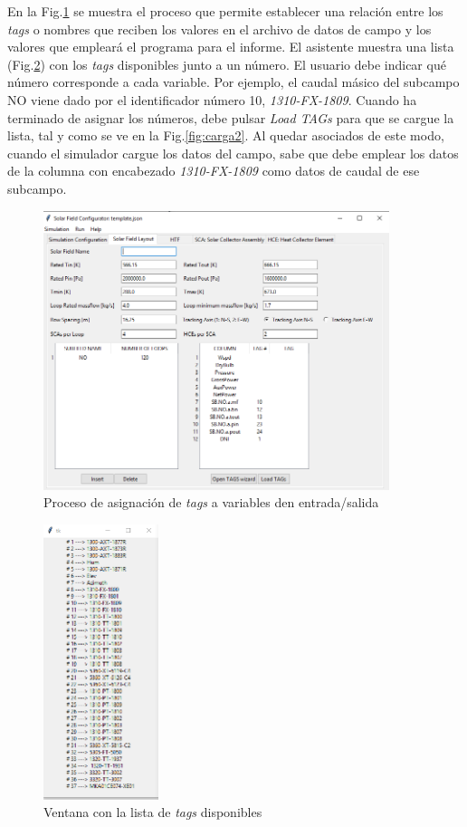 En la Fig.\ref{fig:carga1} se muestra el proceso que permite establecer una relación entre los \emph{tags} o nombres que reciben los valores en el archivo de datos de campo y los valores que empleará el programa para el informe. El asistente muestra una lista (Fig.\ref{fig:listatags}) con los \emph{tags} disponibles junto a un número. El usuario debe indicar qué número corresponde a cada variable. Por ejemplo, el caudal másico del subcampo NO viene dado por el identificador número 10, \emph{1310-FX-1809}. Cuando ha terminado de asignar los números, debe pulsar \emph{Load TAGs} para que se cargue la lista, tal y como se ve en la Fig.\ref{fig:carga2}. Al quedar asociados de este modo, cuando el simulador cargue los datos del campo, sabe que debe emplear los datos de la columna con encabezado \emph{1310-FX-1809} como datos de caudal de ese subcampo.

\begin{figure}[H]
\includegraphics[width=0.9\textwidth, height=0.7\textwidth]{images/carga_tags.png}
\caption{Proceso de asignación de \emph{tags} a variables den entrada/salida}
\label{fig:carga1}
\end{figure}

\begin{figure}[H]
\includegraphics[width=0.3\textwidth, height=0.5\textwidth]{images/tagslist.png}
\caption{Ventana con la lista de \emph{tags} disponibles}
\label{fig:listatags}
\end{figure}

